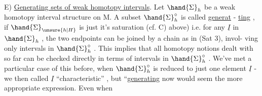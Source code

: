 E) \uline{Generating sets of  weak homotopy intervals}.  Let $\hand{\Sigma}_h$ be a
weak homotopy interval structure on M.  A subset $\hand{\Sigma}^{\circ}_{h}$ is called \uline{generat} -%
\uline{ting} , if $\hand{\Sigma}_{\unsure{h|H}}$ is just it's saturation (cf. C) above) i.e. for any $\underline{I}$ in
$\hand{\Sigma}_h$ , the two endpoints can be joined by a chain\unsure{\xout{,}} as in (Sat 3), invol-%
ving only intervals in $\hand{\Sigma}^{\circ}_{h}$ . This implies that all homotopy notions
dealt with  so far can be checked directly in terms of intervals in
$\hand{\Sigma}^{\circ}_{h}$ . We've met a particular case of this before, when $\hand{\Sigma}^{\circ}_{h}$ is reduced
to just one element $\underline{I}$ - we then called $\underline{I}$ ``characteristic'' , but
``\uline{generating}  now would seem the more appropriate expression. Even when

